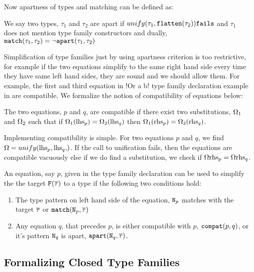 \documentclass[format=acmsmall,manuscript,review,screen,nonacm,margin=1in,11pt]{acmart}
\begin{document}
Now apartness of types and matching can be defined as:
\begin{defn}\label{def:apart-match-ty}
  We say two types, $\tau_1$ and $\tau_2$ are apart if $unify(\tau_1,\texttt{flatten}(\tau_2))\texttt{fails}$ and $\tau_1$ does not
  mention type family constructors and dually, $\texttt{match}(\tau_1, \tau_2) = \lnot\texttt{apart}(\tau_1, \tau_2)$
\end{defn}
Simplification of type families just by using apartness criterion is too restrictive,
for example if the two equations simplify to the
same right hand side every time they have same left hand sides,
they are sound and we should allow them. For example, the first and third equation in
!Or a b! type family declaration example in  are compatible.
We formalize the notion of compatibility of equations below:
\begin{defn}\label{def:compact-eq}
  The two equations, $p$ and $q$, are compatible
  if there exist two substitutions, $\Omega_1$ and $\Omega_2$ such that
  if $\Omega_1(\text{lhs}_{p}) = \Omega_2(\text{lhs}_{q})$ then $\Omega_1(\text{rhs}_{p}) = \Omega_2(\text{rhs}_{q})$.
\end{defn}
Implementing compatibility is simple. For two equations $p$ and $q$, we find $\Subst = \unify{\lhs p, \lhs q}$.
If the call to unification fails, then the equations are compatible vacuously else if we do find a substitution,
we check if $\Omega\text{rhs}_{p} = \Omega\text{rhs}_{q}$. 
\begin{defn}\label{def:cft-simpl}
  An equation, say $p$, given in the type family declaration can be used to simplify the the
  target $\texttt{F}(\overline{\tau})$ to a type if the following two conditions hold:
  \begin{enumerate}
  \item The type pattern on left hand side of the equation, $\texttt{N}_p$ matches with the
    target $\overline{\tau}$ or $\texttt{match}(\texttt{N}_p, \overline{\tau})$
  \item Any equation $q$, that precedes $p$, is either compatible with $p$, $\texttt{compat}(p, q)$,
    or it's pattern $\texttt{N}_q$ is apart, $\texttt{apart}(\texttt{N}_q, \overline{\tau})$.
  \end{enumerate}
\end{defn}


\subsection{Formalizing Closed Type Families}\label{subsec:tf-closed-formal}
\end{document}
